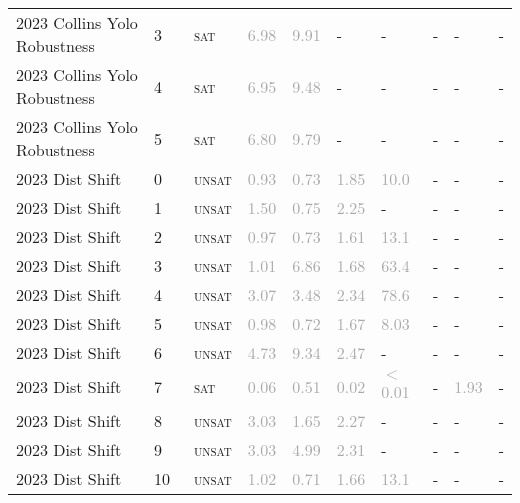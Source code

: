 \begin{center}
{\begin{longtable}{@{}llllllllll@{}}
2023 Collins Yolo Robustness & 3 & ~\textsc{sat} & \textcolor{darkgray}{6.98} & \textcolor{darkgray}{9.91} & - & - & - & - & - \\
2023 Collins Yolo Robustness & 4 & ~\textsc{sat} & \textcolor{darkgray}{6.95} & \textcolor{darkgray}{9.48} & - & - & - & - & - \\
2023 Collins Yolo Robustness & 5 & ~\textsc{sat} & \textcolor{darkgray}{6.80} & \textcolor{darkgray}{9.79} & - & - & - & - & - \\
\midrule
2023 Dist Shift & 0 & ~\textsc{unsat} & \textcolor{darkgray}{0.93} & \textcolor{darkgray}{0.73} & \textcolor{darkgray}{1.85} & \textcolor{darkgray}{10.0} & - & - & - \\
2023 Dist Shift & 1 & ~\textsc{unsat} & \textcolor{darkgray}{1.50} & \textcolor{darkgray}{0.75} & \textcolor{darkgray}{2.25} & - & - & - & - \\
2023 Dist Shift & 2 & ~\textsc{unsat} & \textcolor{darkgray}{0.97} & \textcolor{darkgray}{0.73} & \textcolor{darkgray}{1.61} & \textcolor{darkgray}{13.1} & - & - & - \\
2023 Dist Shift & 3 & ~\textsc{unsat} & \textcolor{darkgray}{1.01} & \textcolor{darkgray}{6.86} & \textcolor{darkgray}{1.68} & \textcolor{darkgray}{63.4} & - & - & - \\
2023 Dist Shift & 4 & ~\textsc{unsat} & \textcolor{darkgray}{3.07} & \textcolor{darkgray}{3.48} & \textcolor{darkgray}{2.34} & \textcolor{darkgray}{78.6} & - & - & - \\
2023 Dist Shift & 5 & ~\textsc{unsat} & \textcolor{darkgray}{0.98} & \textcolor{darkgray}{0.72} & \textcolor{darkgray}{1.67} & \textcolor{darkgray}{8.03} & - & - & - \\
2023 Dist Shift & 6 & ~\textsc{unsat} & \textcolor{darkgray}{4.73} & \textcolor{darkgray}{9.34} & \textcolor{darkgray}{2.47} & - & - & - & - \\
2023 Dist Shift & 7 & ~\textsc{sat} & \textcolor{darkgray}{0.06} & \textcolor{darkgray}{0.51} & \textcolor{darkgray}{0.02} & \textcolor{darkgray}{$<$0.01} & - & \textcolor{darkgray}{1.93} & - \\
2023 Dist Shift & 8 & ~\textsc{unsat} & \textcolor{darkgray}{3.03} & \textcolor{darkgray}{1.65} & \textcolor{darkgray}{2.27} & - & - & - & - \\
2023 Dist Shift & 9 & ~\textsc{unsat} & \textcolor{darkgray}{3.03} & \textcolor{darkgray}{4.99} & \textcolor{darkgray}{2.31} & - & - & - & - \\
2023 Dist Shift & 10 & ~\textsc{unsat} & \textcolor{darkgray}{1.02} & \textcolor{darkgray}{0.71} & \textcolor{darkgray}{1.66} & \textcolor{darkgray}{13.1} & - & - & - \\

\end{longtable}}
\end{center}
